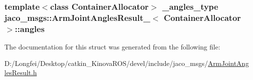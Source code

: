 \subsubsection[{\texorpdfstring{angles}{angles}}]{\setlength{\rightskip}{0pt plus 5cm}template$<$class Container\+Allocator$>$ {\bf \+\_\+angles\+\_\+type} {\bf jaco\+\_\+msgs\+::\+Arm\+Joint\+Angles\+Result\+\_\+}$<$ Container\+Allocator $>$\+::angles}\hypertarget{structjaco__msgs_1_1ArmJointAnglesResult___a5b6fe64a0d822194474af38863a9f8a2}{}\label{structjaco__msgs_1_1ArmJointAnglesResult___a5b6fe64a0d822194474af38863a9f8a2}


The documentation for this struct was generated from the following file\+:\begin{DoxyCompactItemize}
\item 
D\+:/\+Longfei/\+Desktop/catkin\+\_\+\+Kinova\+R\+O\+S/devel/include/jaco\+\_\+msgs/\hyperlink{ArmJointAnglesResult_8h}{Arm\+Joint\+Angles\+Result.\+h}\end{DoxyCompactItemize}
